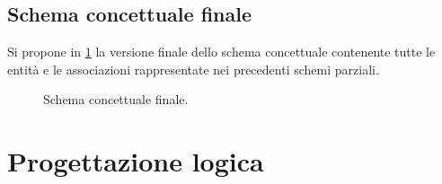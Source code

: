 \documentclass[a4paper,12pt]{report}
\begin{document}
\section{Schema concettuale finale}
Si propone in \cref{fig:full-schema} la versione finale dello schema concettuale contenente tutte le entità e le associazioni rappresentate nei precedenti schemi parziali.

\begin{figure}
\centering{}
\caption{Schema concettuale finale.}
\label{fig:full-schema}
\end{figure}

\chapter{Progettazione logica}
\end{document}
